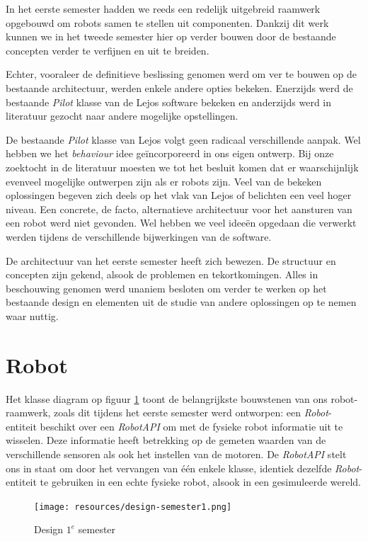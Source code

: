 \documentclass[12pt,a4paper]{report}
\begin{document}
In het eerste semester hadden we reeds een redelijk uitgebreid raamwerk opgebouwd om robots samen te stellen uit componenten. Dankzij dit werk kunnen we in het tweede semester hier op verder bouwen door de bestaande concepten verder te verfijnen en uit te breiden.

Echter, vooraleer de definitieve beslissing genomen werd om ver te bouwen op de bestaande architectuur, werden enkele andere opties bekeken. Enerzijds werd de bestaande \emph{Pilot} klasse van de Lejos software bekeken en anderzijds werd in literatuur gezocht naar andere mogelijke opstellingen.

De bestaande \emph{Pilot} klasse van Lejos volgt geen radicaal verschillende aanpak. Wel hebben we het \emph{behaviour} idee ge\"incorporeerd in ons eigen ontwerp. Bij onze zoektocht in de literatuur moesten we tot het besluit komen dat er waarschijnlijk evenveel mogelijke ontwerpen zijn als er robots zijn. Veel van de bekeken oplossingen begeven zich deels op het vlak van Lejos of belichten een veel hoger niveau. Een concrete, de facto, alternatieve architectuur voor het aansturen van een robot werd niet gevonden. Wel hebben we veel idee\"en opgedaan die verwerkt werden tijdens de verschillende bijwerkingen van de software.

De architectuur van het eerste semester heeft zich bewezen. De structuur en concepten zijn gekend, alsook de problemen en tekortkomingen. Alles in beschouwing genomen werd unaniem besloten om verder te werken op het bestaande design en elementen uit de studie van andere oplossingen op te nemen waar nuttig.

\section{Robot}

Het klasse diagram op figuur \ref{uml:design-semester1} toont de belangrijkste bouwstenen van ons robot-raamwerk, zoals dit tijdens het eerste semester werd ontworpen: een \emph{Robot}-entiteit beschikt over een \emph{RobotAPI} om met de fysieke robot informatie uit te wisselen. Deze informatie heeft betrekking op de gemeten waarden van de verschillende sensoren als ook het instellen van de motoren. De \emph{RobotAPI} stelt ons in staat om door het vervangen van \'e\'en enkele klasse, identiek dezelfde \emph{Robot}-entiteit te gebruiken in een echte fysieke robot, alsook in een gesimuleerde wereld.

\begin{figure}[htbp]
  \centering
  \texttt{[image: resources/design-semester1.png]}
  \caption{Design $1^e$ semester}
  \label{uml:design-semester1}
\end{figure}
\end{document}
